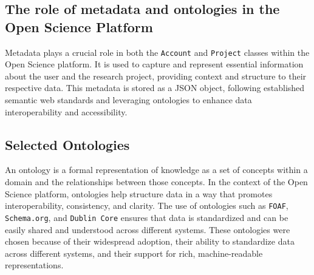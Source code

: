 \documentclass{article}
\begin{document}
\subsection{The role of metadata and ontologies in the Open Science Platform}

Metadata plays a crucial role in both the \texttt{Account} and \texttt{Project} classes within the Open Science platform. It is used to capture and represent essential information about the user and the research project, providing context and structure to their respective data. This metadata is stored as a  JSON object, following established semantic web standards and leveraging ontologies to enhance data interoperability and accessibility.


\subsection{Selected Ontologies}
An ontology is a formal representation of knowledge as a set of concepts within a domain and the relationships between those concepts. In the context of the Open Science platform, ontologies help structure data in a way that promotes interoperability, consistency, and clarity. The use of ontologies such as \texttt{FOAF}, \texttt{Schema.org}, and \texttt{Dublin Core} ensures that data is standardized and can be easily shared and understood across different systems. These ontologies were chosen because of their widespread adoption, their ability to standardize data across different systems, and their support for rich, machine-readable representations.
\end{document}
